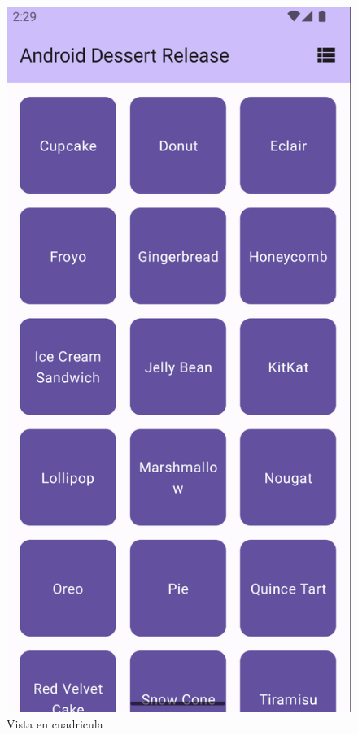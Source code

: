 \documentclass{article}
\begin{document}
        \begin{figure}[H]
            \centerline{\includegraphics[scale=0.3]{codelab2.1_2.png}}
            \caption{Vista en cuadricula}
            \label{fig:codelab2.1_2}
        \end{figure}
\end{document}
